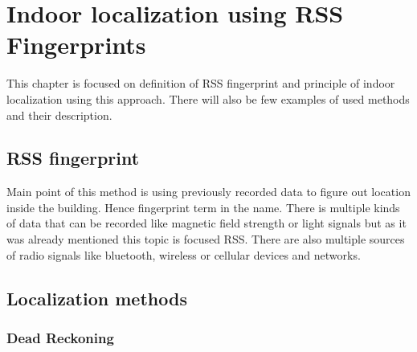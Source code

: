\chapter{Indoor localization using RSS Fingerprints}\label{sec:Indoor localization using RSS Fingerptints}
This chapter is focused on definition of RSS fingerprint and principle of indoor localization using this approach. There will also be few examples of used methods and their description.

\section{RSS fingerprint}\label{sec:RSSFingerprintDefinition}
Main point of this method is using previously recorded data to figure out location inside the building. Hence fingerprint term in the name. There is multiple kinds of data that can be recorded like magnetic field strength or light signals but as it was already mentioned this topic is focused RSS. There are also multiple sources of radio signals like bluetooth, wireless or cellular devices and networks.

\section{Localization methods}\label{sec:LocalizationMethods}

\subsection{Dead Reckoning}\label{sec:DeadReckoning}
